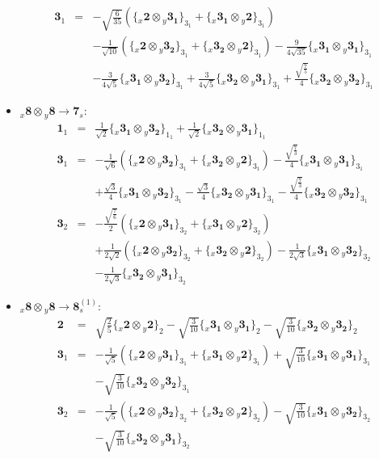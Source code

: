 \documentclass[english]{article}
\newcommand{\rep}[1]{\mathbf{#1}}
\newcommand{\repx}[2]{{}_{#2}\mathbf{#1}}
\newcommand{\subcg}[3]{\big\{ \repx{#1}{x}\otimes\repx{#2}{y}\big\}^{}_{#3}}
\begin{document}
\begin{itemize}
\begin{eqnarray*}
\\
\rep{3}_{1} &=& -\sqrt{\frac{6}{35}}\left(\subcg{2}{3_{1}}{3_{1}}+\subcg{3_{1}}{2}{3_{1}}\right) \\ 
 & & -\frac{1}{\sqrt{10}}\left(\subcg{2}{3_{2}}{3_{1}}+\subcg{3_{2}}{2}{3_{1}}\right)-\frac{9}{4 \sqrt{35}}\subcg{3_{1}}{3_{1}}{3_{1}} \\ 
 & & -\frac{3}{4 \sqrt{5}}\subcg{3_{1}}{3_{2}}{3_{1}}+\frac{3}{4 \sqrt{5}}\subcg{3_{2}}{3_{1}}{3_{1}}+\frac{\sqrt{\frac{7}{5}}}{4}\subcg{3_{2}}{3_{2}}{3_{1}}
\end{eqnarray*}
\item $\repx{8}{x}\otimes\repx{8}{y}\to\rep{7}_{s}$:
\begin{eqnarray*}
\rep{1}_{1} &=& \frac{1}{\sqrt{2}}\subcg{3_{1}}{3_{2}}{1_{1}}+\frac{1}{\sqrt{2}}\subcg{3_{2}}{3_{1}}{1_{1}}
\\
\rep{3}_{1} &=& -\frac{1}{\sqrt{6}}\left(\subcg{2}{3_{2}}{3_{1}}+\subcg{3_{2}}{2}{3_{1}}\right)-\frac{\sqrt{\frac{7}{3}}}{4}\subcg{3_{1}}{3_{1}}{3_{1}} \\ 
 & & +\frac{\sqrt{3}}{4}\subcg{3_{1}}{3_{2}}{3_{1}}-\frac{\sqrt{3}}{4}\subcg{3_{2}}{3_{1}}{3_{1}}-\frac{\sqrt{\frac{7}{3}}}{4}\subcg{3_{2}}{3_{2}}{3_{1}}
\\
\rep{3}_{2} &=& -\frac{\sqrt{\frac{7}{6}}}{2}\left(\subcg{2}{3_{1}}{3_{2}}+\subcg{3_{1}}{2}{3_{2}}\right) \\ 
 & & +\frac{1}{2 \sqrt{2}}\left(\subcg{2}{3_{2}}{3_{2}}+\subcg{3_{2}}{2}{3_{2}}\right)-\frac{1}{2 \sqrt{3}}\subcg{3_{1}}{3_{2}}{3_{2}} \\ 
 & & -\frac{1}{2 \sqrt{3}}\subcg{3_{2}}{3_{1}}{3_{2}}
\end{eqnarray*}
\item $\repx{8}{x}\otimes\repx{8}{y}\to\rep{8}_{s}^{(1)}$:
\begin{eqnarray*}
\rep{2} &=& \sqrt{\frac{2}{5}}\subcg{2}{2}{2}-\sqrt{\frac{3}{10}}\subcg{3_{1}}{3_{1}}{2}-\sqrt{\frac{3}{10}}\subcg{3_{2}}{3_{2}}{2}
\\
\rep{3}_{1} &=& -\frac{1}{\sqrt{5}}\left(\subcg{2}{3_{1}}{3_{1}}+\subcg{3_{1}}{2}{3_{1}}\right)+\sqrt{\frac{3}{10}}\subcg{3_{1}}{3_{1}}{3_{1}} \\ 
 & & -\sqrt{\frac{3}{10}}\subcg{3_{2}}{3_{2}}{3_{1}}
\\
\rep{3}_{2} &=& -\frac{1}{\sqrt{5}}\left(\subcg{2}{3_{2}}{3_{2}}+\subcg{3_{2}}{2}{3_{2}}\right)-\sqrt{\frac{3}{10}}\subcg{3_{1}}{3_{2}}{3_{2}} \\ 
 & & -\sqrt{\frac{3}{10}}\subcg{3_{2}}{3_{1}}{3_{2}}
\end{eqnarray*}

\end{itemize}
\end{document}
